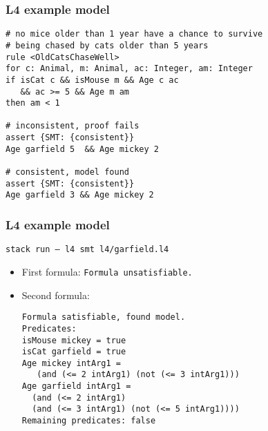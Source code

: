 \documentclass{beamer}
\begin{document}
\begin{frame}[fragile]\frametitle{L4 example model}


\begin{verbatim}
# no mice older than 1 year have a chance to survive 
# being chased by cats older than 5 years
rule <OldCatsChaseWell>
for c: Animal, m: Animal, ac: Integer, am: Integer
if isCat c && isMouse m && Age c ac 
   && ac >= 5 && Age m am 
then am < 1

# inconsistent, proof fails
assert {SMT: {consistent}}
Age garfield 5  && Age mickey 2

# consistent, model found
assert {SMT: {consistent}} 
Age garfield 3 && Age mickey 2

\end{verbatim}

\end{frame}



\begin{frame}[fragile]\frametitle{L4 example model}

\texttt{stack run -- l4 smt l4/garfield.l4}

\begin{itemize}
\item First formula: \texttt{Formula unsatisfiable.}
\item Second formula:
\begin{verbatim}
Formula satisfiable, found model.
Predicates: 
isMouse mickey = true
isCat garfield = true
Age mickey intArg1 = 
   (and (<= 2 intArg1) (not (<= 3 intArg1)))
Age garfield intArg1 = 
  (and (<= 2 intArg1) 
  (and (<= 3 intArg1) (not (<= 5 intArg1))))
Remaining predicates: false
\end{verbatim}
\end{itemize}

\end{frame}

\end{document}

